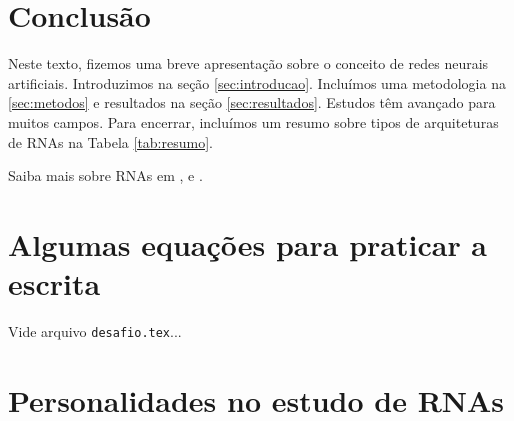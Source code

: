 \documentclass[10pt,journal,compsoc]{IEEEtran}
\begin{document}


\section{Conclusão}

Neste texto, fizemos uma breve apresentação sobre o conceito de redes 
neurais artificiais. Introduzimos na seção \ref{sec:introducao}. 
Incluímos uma metodologia na \ref{sec:metodos} e resultados na 
seção \ref{sec:resultados}. Estudos têm avançado para muitos campos. Para encerrar,
incluímos um resumo sobre tipos de arquiteturas de RNAs na Tabela \ref{tab:resumo}.
\renewcommand{\arraystretch}{2.0}
\begin{table}[h!]
\caption{\label{tab:resumo}Tabela-resumo dos tipos de arquitetura de RNAs.}
\end{table}

Saiba mais sobre RNAs em \cite{haykin1994neural}, \cite{braga2007} e \cite{kovacs2002redes}.


\appendices

\section{Algumas equações para praticar a escrita}

Vide arquivo \texttt{desafio.tex}...

\section{Personalidades no estudo de RNAs}
\end{document}
